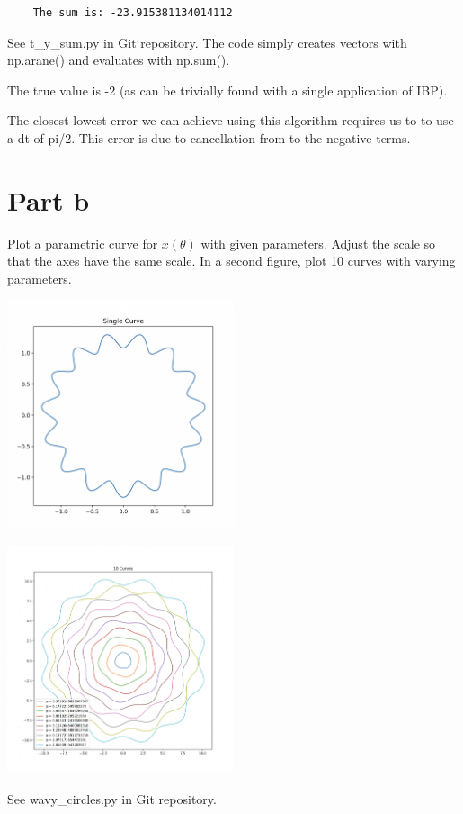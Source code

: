 \documentclass[12pt]{article}
\begin{document}
\begin{verbatim}
	The sum is: -23.915381134014112
\end{verbatim}

See t\_y\_sum.py in Git repository. The code simply creates vectors with np.arane() and evaluates with np.sum().

The true value is -2 (as can be trivially found with a single application of IBP). 

The closest lowest error we can achieve using this algorithm requires us to to use a dt of pi/2. This error is due to cancellation from to the negative terms.

\newpage

\section*{Part b}

Plot a parametric curve for $x(\theta)$ with given parameters. Adjust the scale so that the axes have the same scale. In a second figure, plot 10 curves with varying parameters.

\includegraphics[width=0.5\textwidth]{screenshot2.png}


\includegraphics[width=0.5\textwidth]{screenshot1.png}

See wavy\_circles.py in Git repository.
\end{document}
